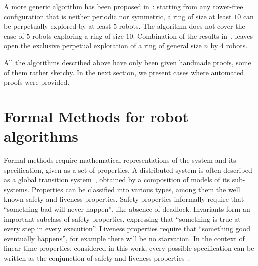 A more generic algorithm has been proposed in~\cite{navarraipdps2013}: 
starting from any  tower-free configuration that is neither periodic nor symmetric, a ring of size at least $10$ can be perpetually explored by at least $5$ robots. The algorithm does not cover the case of $5$ robots exploring a ring of size $10$. 
Combination of the results in~\cite{blin_exclusive_2010,navarraipdps2013}, leaves open the exclusive perpetual exploration of a ring of general size $n$ by 4 robots.


\bigskip

All the algorithms described above have only been given handmade proofs, some of them rather sketchy. 
In the next section, we present cases where automated proofs were provided.

	
	\section{Formal Methods for robot algorithms}
Formal methods require mathematical representations of the system and its specification, given as a set of properties.
A distributed system is often described as a global transition system~\cite{Tel:2001:IDA:517021, DBLP:books/mk/Lynch96},
obtained by a composition of models of its sub-systems. 
 Properties can be classified into various types, among them 
 the well known safety and liveness properties. Safety properties informally require that ``something bad will never happen'', 
 like absence of deadlock. Invariants form an important subclass of safety properties, expressing that ``something is true at every step in every execution''.
 Liveness properties require that ``something good eventually happens'', for example there will be no starvation.
%
%
In the context of linear-time properties, considered in this work, every possible specification can be written as the conjunction of safety and liveness properties~\cite{AlpernS85}.%

